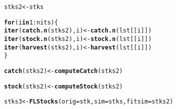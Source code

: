 \documentclass[a4paper,english,10pt]{article}\usepackage[]{graphicx}\usepackage[]{color}
\makeatletter
\newcommand{\hlnum}[1]{\textcolor[rgb]{0.686,0.059,0.569}{#1}}%
\newcommand{\hlopt}[1]{\textcolor[rgb]{0,0,0}{#1}}%
\newcommand{\hlstd}[1]{\textcolor[rgb]{0.345,0.345,0.345}{#1}}%
\newcommand{\hlkwa}[1]{\textcolor[rgb]{0.161,0.373,0.58}{\textbf{#1}}}%
\newcommand{\hlkwb}[1]{\textcolor[rgb]{0.69,0.353,0.396}{#1}}%
\newcommand{\hlkwc}[1]{\textcolor[rgb]{0.333,0.667,0.333}{#1}}%
\newcommand{\hlkwd}[1]{\textcolor[rgb]{0.737,0.353,0.396}{\textbf{#1}}}%
\newenvironment{kframe}{%
 \def\at@end@of@kframe{}%
 \ifinner\ifhmode%
  \def\at@end@of@kframe{\end{minipage}}%
  \begin{minipage}{\columnwidth}%
 \fi\fi%
 \def\FrameCommand##1{\hskip\@totalleftmargin \hskip-\fboxsep
 \colorbox{shadecolor}{##1}\hskip-\fboxsep
     \hskip-\linewidth \hskip-\@totalleftmargin \hskip\columnwidth}%
 \MakeFramed {\advance\hsize-\width
   \@totalleftmargin\z@ \linewidth\hsize
   \@setminipage}}%
 {\par\unskip\endMakeFramed%
 \at@end@of@kframe}
\newenvironment{knitrout}{}{} %
\makeatother
\begin{document}
\begin{knitrout}
\begin{kframe}
\begin{alltt}
\hlstd{stks2} \hlkwb{<-} \hlstd{stks}
\end{alltt}


{\ttfamily\noindent\bfseries\color{errorcolor}{\#\# Error: object 'stks' not found}}\begin{alltt}
\hlkwa{for}\hlstd{(i} \hlkwa{in} \hlnum{1}\hlopt{:}\hlstd{nits)\{}
        \hlkwd{iter}\hlstd{(}\hlkwd{catch.n}\hlstd{(stks2), i)} \hlkwb{<-} \hlkwd{catch.n}\hlstd{(lst[[i]])}
        \hlkwd{iter}\hlstd{(}\hlkwd{stock.n}\hlstd{(stks2), i)} \hlkwb{<-} \hlkwd{stock.n}\hlstd{(lst[[i]])}
        \hlkwd{iter}\hlstd{(}\hlkwd{harvest}\hlstd{(stks2), i)} \hlkwb{<-} \hlkwd{harvest}\hlstd{(lst[[i]])}
\hlstd{\}}
\end{alltt}


{\ttfamily\noindent\bfseries{}}\begin{alltt}
\hlkwd{catch}\hlstd{(stks2)} \hlkwb{<-} \hlkwd{computeCatch}\hlstd{(stks2)}
\end{alltt}


{\ttfamily\noindent\bfseries{}}\begin{alltt}
\hlkwd{stock}\hlstd{(stks2)} \hlkwb{<-} \hlkwd{computeStock}\hlstd{(stks2)}
\end{alltt}


{\ttfamily\noindent\bfseries{}}\begin{alltt}
\hlstd{stks3} \hlkwb{<-} \hlkwd{FLStocks}\hlstd{(}\hlkwc{orig}\hlstd{=stk,} \hlkwc{sim}\hlstd{=stks,} \hlkwc{fitsim}\hlstd{=stks2)}
\end{alltt}


{\ttfamily\noindent\bfseries{}}\end{kframe}
\end{knitrout}

\begin{knitrout}
\color{fgcolor}\begin{kframe}


{\ttfamily\noindent\bfseries\color{errorcolor}{\#\# Error: object 'stks3' not found}}\end{kframe}
\end{knitrout}

\end{document}
